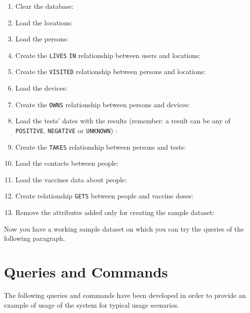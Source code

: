 \documentclass{article}
\begin{document}
\begin{enumerate}
    \item Clear the database: 
    \item Load the locations: 
    \item Load the persons: 
    \item Create the \verb |LIVES| \verb |IN| relationship between users and locations:
    \item Create the \verb |VISITED| relationship between persons and locations:
    \item Load the devices: 
    \item Create the \verb |OWNS| relationship between persons and devices:
    \item Load the tests' dates with the results (remember: a result can be any of \verb |POSITIVE|, \verb |NEGATIVE| or \verb |UNKNOWN|) :
    \item Create the \verb |TAKES| relationship between persons and tests:
    \item Load the contacts between people: 
    \item Load the vaccines data about people:
    \item Create relationship \verb |GETS| between people and vaccine doses: 
    \item Remove the attributes added only for creating the sample dataset: 
\end{enumerate}
Now you have a working sample dataset on which you can try the queries of the following paragraph.
\newpage
\section{Queries and Commands}
The following queries and commands have been developed in order to provide an example of usage of the system for typical usage scenarios.
\end{document}
